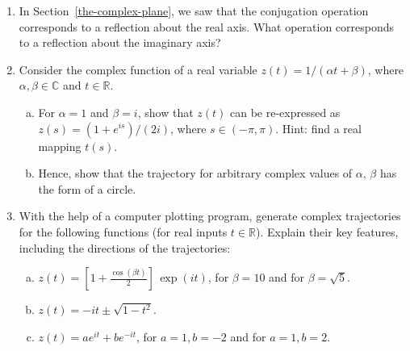 \documentclass[10pt,a4paper]{article}
\begin{document}
\begin{enumerate}
\item
  In Section~\ref{the-complex-plane}, we saw that the conjugation
  operation corresponds to a reflection about the real axis. What
  operation corresponds to a reflection about the imaginary axis?

\item
  Consider the complex function of a real variable $z(t) = 1/(\alpha t
  + \beta)$, where $\alpha, \beta \in \mathbb{C}$ and $t \in
  \mathbb{R}$.

  \begin{enumerate}[(a)]
  \item
    For $\alpha = 1$ and $\beta = i$, show that $z(t)$ can be
    re-expressed as $z(s) = (1+e^{is})/(2i)$, where
    $s \in (-\pi,\pi)$. Hint: find a real mapping $t(s)$.

  \item
    Hence, show that the trajectory for arbitrary complex values of
    $\alpha,\, \beta$ has the form of a circle.
  \end{enumerate}

\item
  With the help of a computer plotting program, generate complex
  trajectories for the following functions (for real inputs $t
  \in\mathbb{R}$). Explain their key features, including the
  directions of the trajectories:
  \begin{enumerate}[(a)]
  \item
    $\displaystyle z(t) = \left[1+\frac{\cos(\beta t)}{2}\right] \, \exp(it)$,
    for $\beta = 10$ and for $\beta = \sqrt{5}$.
  \item
    $\displaystyle z(t) = -it \pm \sqrt{1 - t^2}$.
  \item
    $\displaystyle z(t) = ae^{it} + be^{-it}$, for $a = 1, b = -2$
    and for $a = 1, b = 2$.
  \end{enumerate}
\end{enumerate}
\end{document}
